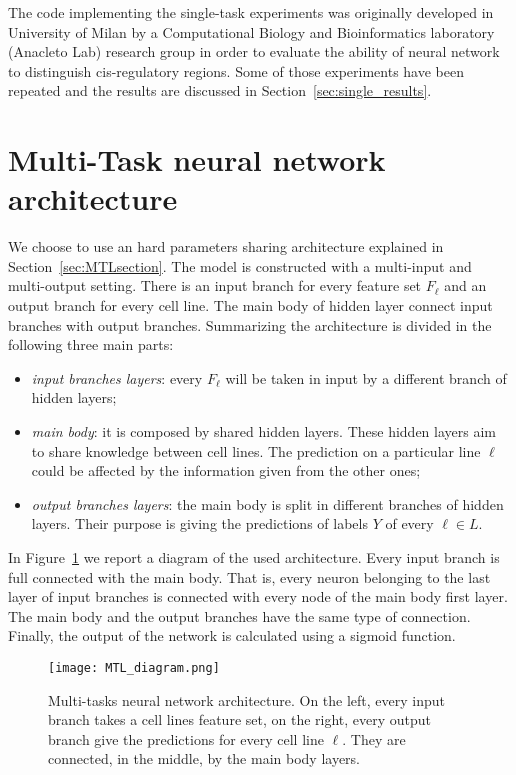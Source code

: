 The code implementing the single-task experiments was originally developed in University of Milan by a Computational Biology and Bioinformatics laboratory (Anacleto Lab) research group in order to evaluate the ability of neural network to distinguish cis-regulatory regions. Some of those experiments have been repeated and the results are discussed in Section~\ref{sec:single_results}. 

\section{Multi-Task neural network architecture} \label{sec:exp_setup_multitask}
We choose to use an hard parameters sharing architecture explained in Section~\ref{sec:MTLsection}. The model is constructed with a multi-input and multi-output setting. There is an input branch for every feature set $F_\ell$ and an output branch for every cell line. The main body of hidden layer connect input branches with output branches. Summarizing the architecture is divided in the following three main parts:
\begin{itemize}
    \item \textit{input branches layers}: every $F_\ell$ will be taken in input by a different branch of hidden layers;
    \item \textit{main body}: it is composed by shared hidden layers. These hidden layers aim to share knowledge between cell lines. The prediction on a particular line $\ell$ could be affected by the information given from the other ones;
    \item \textit{output branches layers}: the main body is split in different branches of hidden layers. Their purpose is giving the predictions of labels $Y$ of every $\ell \in L$.
\end{itemize}
In Figure~\ref{fig:MTL_arch_diagram} we report a diagram of the used architecture. Every input branch is full connected with the main body. That is, every neuron belonging to the last layer of input branches is connected with every node of the main body first layer. The main body and the output branches have the same type of connection. Finally, the output of the network is calculated using a sigmoid function. 
\begin{figure}[ht]
\centering
\texttt{[image: MTL\_diagram.png]}
\caption{Multi-tasks neural network architecture. On the left, every input branch takes a cell lines feature set, on the right, every output branch give the predictions for every cell line $\ell$. They are connected, in the middle, by the main body layers. } 
\label{fig:MTL_arch_diagram}
\end{figure}
